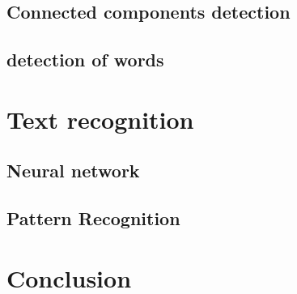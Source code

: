 \documentclass[paper=a4, french, 11pt]{scrartcl}
\begin{document}
\subsection{Connected components detection}
\subsection{detection of words}

\section{Text recognition}
\subsection{Neural network}
\subsection{Pattern Recognition}

\section{Conclusion}
\end{document}
